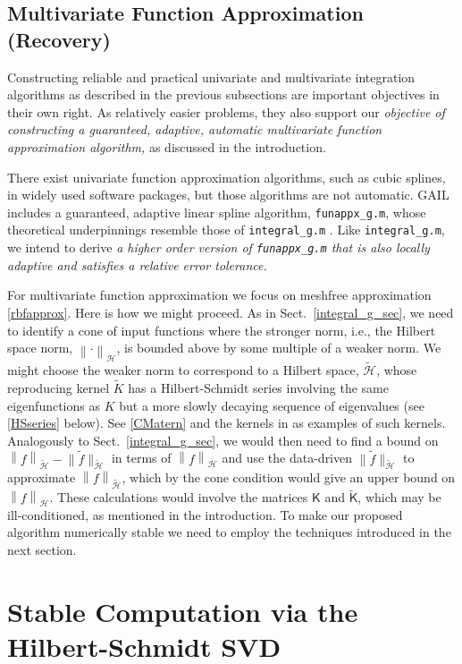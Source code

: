 \documentclass[11pt]{NSFamsart}
\newcommand{\tf}{\tilde{f}}
\newcommand{\mK}{\mathsf{K}}
\newcommand{\tmK}{\widetilde{\mathsf{K}}}
\newcommand{\norm}[2][{}]{\ensuremath{\left \lVert #2 \right \rVert}_{#1}}
\newcommand{\ch}{\mathcal{H}}
\newcommand{\tch}{{\widetilde{\ch}}}
\newcommand{\tK}{\widetilde{K}}
\begin{document}
\subsection{Multivariate Function Approximation (Recovery)}\label{SecRecovery}
Constructing reliable and practical  univariate and multivariate integration algorithms as described in the previous subsections are important objectives in their own right.  As relatively easier problems, they also support our \emph{objective of constructing a guaranteed, adaptive, automatic multivariate function approximation algorithm,} as discussed in the introduction.

There exist univariate function approximation algorithms, such as cubic splines, in widely used software packages, but those algorithms are not automatic.  GAIL \citep{ChoEtal14a} includes a guaranteed, adaptive linear spline algorithm, {\tt funappx\_g.m}, whose theoretical underpinnings resemble those of {\tt integral\_g.m} \citep{HicEtal14b}.  Like {\tt integral\_g.m}, we intend to derive \emph{a higher order version of {\tt funappx\_g.m} that is also locally adaptive and satisfies a relative error tolerance.}

For multivariate function approximation we focus on meshfree approximation \eqref{rbfapprox}.  Here is how we might proceed.  As in Sect.\ \ref{integral_g_sec}, we need to identify a cone of input functions where the stronger norm, i.e., the Hilbert space norm, $\norm[\ch]{\cdot}$, is bounded above by some multiple of a weaker norm.  We might choose the weaker norm to correspond to a Hilbert space, $\tch$, whose reproducing kernel $\tK$ has a Hilbert-Schmidt series involving the same eigenfunctions as $K$ but a more slowly decaying sequence of eigenvalues (see \eqref{HSseries} below). See \eqref{CMatern} and the kernels in \citep[Chap.\ 2]{Wah90} as examples of such kernels.  Analogously to Sect.\ \ref{integral_g_sec}, we would then need to find a bound on $\norm[\tch]{f} - \bigl\lVert \tf \bigr \rVert_{\tch}$ in terms of $\norm[\ch]{f}$ and use the data-driven $\bigl\lVert \tf \bigr \rVert_{\tch}$ to approximate $\norm[\tch]{f}$, which by the cone condition would give an upper bound on $\norm[\ch]{f}$. These calculations would involve the matrices $\mK$ and $\tmK$, which may be ill-conditioned, as mentioned in the introduction.  To make our proposed algorithm numerically stable we need to employ the techniques introduced in the next section.


\section{Stable Computation via the Hilbert-Schmidt SVD}\label{SectHSSVD}
\end{document}
